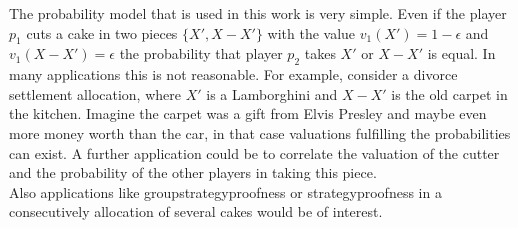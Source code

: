 The probability model that is used in this work is very simple. Even if the player $p_1$ cuts a cake in two pieces $\{X', X-X'\}$ with the value $v_1(X')=1-\epsilon$ and $v_1(X-X')=\epsilon$ the probability that player $p_2$ takes $X'$ or $X-X'$ is equal. In many applications this is not reasonable. For example, consider a divorce settlement allocation, where $X'$ is a Lamborghini and $X-X'$ is the old carpet in the kitchen. Imagine the carpet was a gift from Elvis Presley and maybe even more money worth than the car, in that case valuations fulfilling the probabilities can exist. A further application could be to correlate the valuation of the cutter and the probability of the other players in taking this piece. \\ Also applications like groupstrategyproofness or strategyproofness in a consecutively allocation of several cakes would be of interest.
\pagebreak


\clearpage
\thispagestyle{empty}
\pagestyle{plain}


\thispagestyle{empty}
\pagestyle{plain}
\clearpage

\listoffigures

\listoftables
\thispagestyle{empty}
\pagestyle{plain}

